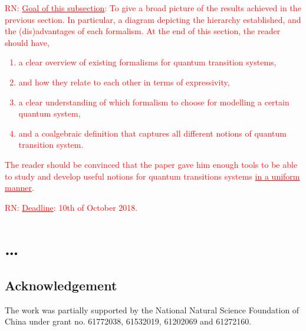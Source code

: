 \documentclass[a4paper, 11pt]{article}
\newcommand{\nevComment}[1]{\textcolor{red}{RN: #1}}
\begin{document}
\nevComment{\underline{Goal of this subsection}: To give a broad
  picture of the results achieved in the previous section. In
  particular, a diagram depicting the hierarchy established, and the
  (dis)advantages of each formalism. At the end of this section, the
  reader should have,
  \begin{enumerate}
  \item a clear overview of existing formalisms for quantum transition systems,
  \item and how they relate to each other in terms of expressivity,
  \item a clear understanding of which formalism to choose for modelling a certain quantum
    system,
  \item and a coalgebraic definition that captures all different
    notions of quantum transition system.
  \end{enumerate}
  The reader should be convinced that the paper gave him enough tools to be able to study and develop
  useful notions for quantum transitions systems \underline{in a uniform manner}. 
}

\noindent
\nevComment{{\large \underline{Deadline}: 10th of October 2018.}}


\section{\dots}

\subsection*{Acknowledgement}
\noindent The work was partially supported by the National Natural Science Foundation of China under grant no. 61772038, 61532019, 61202069 and 61272160.



\end{document}

